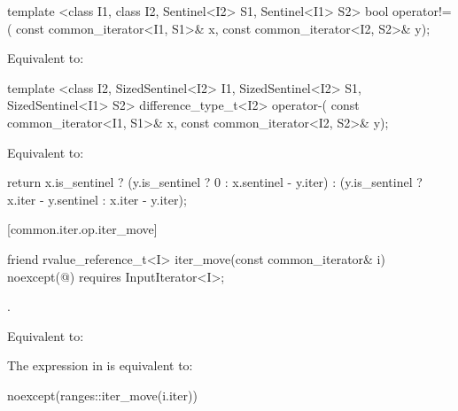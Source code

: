 %
%
\begin{itemdecl}
template <class I1, class I2, Sentinel<I2> S1, Sentinel<I1> S2>
bool operator!=(
  const common_iterator<I1, S1>& x, const common_iterator<I2, S2>& y);
\end{itemdecl}

\begin{itemdescr}
\pnum
\effects Equivalent to:
\end{itemdescr}

%
%
\begin{itemdecl}
template <class I2, SizedSentinel<I2> I1, SizedSentinel<I2> S1, SizedSentinel<I1> S2>
difference_type_t<I2> operator-(
  const common_iterator<I1, S1>& x, const common_iterator<I2, S2>& y);
\end{itemdecl}

\begin{itemdescr}
\pnum
\effects Equivalent to:
\begin{codeblock}
  return x.is_sentinel ?
    (y.is_sentinel ? 0 : x.sentinel - y.iter) :
    (y.is_sentinel ?
         x.iter - y.sentinel :
         x.iter - y.iter);
\end{codeblock}
\end{itemdescr}

[common.iter.op.iter_move]{}

%
%
\begin{itemdecl}
friend rvalue_reference_t<I> iter_move(const common_iterator& i)
  noexcept(@\seebelow@)
    requires InputIterator<I>;
\end{itemdecl}

\begin{itemdescr}
\pnum
\requires {}.

\pnum
\effects Equivalent to: 

\pnum
\remarks The expression in  is equivalent to:
\begin{codeblock}
\end{codeblock}
noexcept(ranges::iter_move(i.iter))
\end{itemdescr}

